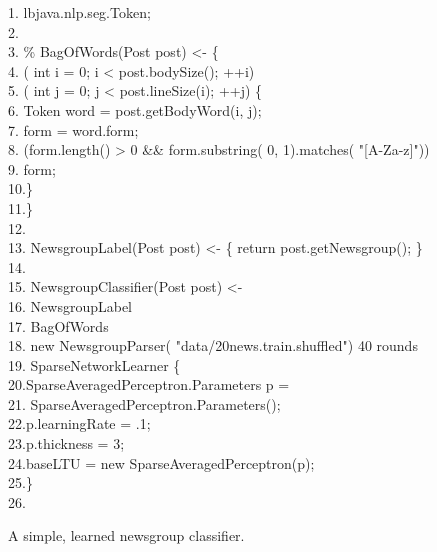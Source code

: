 \begin{figure}[t]
\begin{code}
1.  lbjava.nlp.seg.Token;\\
2. \>\\
3. \% BagOfWords(Post post) <- \{\\
4. \> ({\color{ForestGreen} int} i =
      {\color{BrickRed} 0}; i < post.bodySize(); ++i)\\
5. \>\> ({\color{ForestGreen} int} j =
        {\color{BrickRed} 0}; j < post.lineSize(i); ++j) \{\\
6. \>\>\>\>Token word = post.getBodyWord(i, j);\\
7. \>\>\> form = word.form;\\
8. \>\>\> (form.length() > {\color{BrickRed} 0}
        \&\& form.substring({\color{BrickRed} 0},
            {\color{BrickRed} 1}).matches({\color{BrickRed} "[A-Za-z]"})) \\
9. \>\>\>\> form;\\
10.\>\>\>\}\\
11.\>\}\\
12.\>\\
13. NewsgroupLabel(Post post) <-
     \{ {\color{YellowOrange} return} post.getNewsgroup(); \}\\
14.\>\\
15. NewsgroupClassifier(Post post) <-\\
16. NewsgroupLabel\\
17.\> BagOfWords\\
18.\> {\color{YellowOrange} new}
    NewsgroupParser({\color{BrickRed} "data/20news.train.shuffled"})
    {\color{BrickRed} 40} {\color{RoyalBlue} rounds}\\
19.\> SparseNetworkLearner \{\\
20.\>\>\>SparseAveragedPerceptron.Parameters p =\\
21.\>\>\> SparseAveragedPerceptron.Parameters();\\
22.\>\>\>p.learningRate = {\color{BrickRed} .1};\\
23.\>\>\>p.thickness = {\color{BrickRed} 3};\\
24.\>\>\>baseLTU = {\color{YellowOrange} new} SparseAveragedPerceptron(p);\\
25.\>\>\}\\
26.
\end{code}
\caption{A simple, learned newsgroup classifier.}
\label{fig:lbj20news}
\end{figure}

